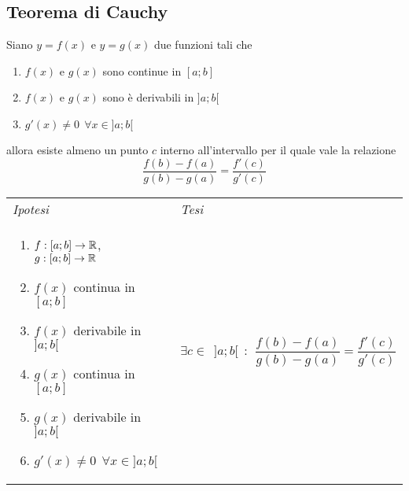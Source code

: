         \subsection{Teorema di Cauchy}
        \begin{shadedTheorem}[Cauchy]
        Siano $y=f(x)$ e $y=g(x)$ due funzioni tali che 
        \begin{enumerate}
            \item $f(x)$ e $g(x)$ sono continue in $[a;b]$
            \item $f(x)$ e $g(x)$ sono è derivabili in $]a;b[$
            \item $g'(x)\neq 0 ~~ \forall x \in ]a;b[$ 
        \end{enumerate}
        allora esiste almeno un punto $c$ interno all'intervallo per il quale vale la relazione \[\frac{f(b)-f(a)}{g(b)-g(a)}=\frac{f'(c)}{g'(c)}\]
        \end{shadedTheorem}
        \begin{tabular}{m{}m{}}
            \textit{Ipotesi} & \textit{Tesi}  \\
            \begin{enumerate}
            \item $f:[a;b] \to \mathbb{R}$, $g: [a;b] \to \mathbb{R}$
            \item $f(x)$ continua in $[a;b]$
            \item $f(x)$ derivabile in $]a;b[$
            \item $g(x)$ continua in $[a;b]$
            \item $g(x)$ derivabile in $]a;b[$
            \item $g'(x)\neq 0 ~~ \forall x \in ]a;b[$
        \end{enumerate} & $\exists c \in~~]a;b[ ~~:~~ \dfrac{f(b)-f(a)}{g(b)-g(a)}=\dfrac{f'(c)}{g'(c)}$
        \end{tabular}

